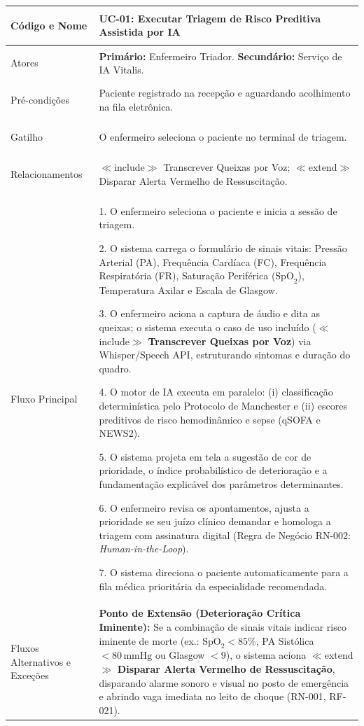 \begingroup
\small
\begin{tabularx}{\textwidth}{>{\bfseries\raggedright\arraybackslash}p{3.4cm} X}
\toprule
Código e Nome & UC-01: Executar Triagem de Risco Preditiva Assistida por IA \\
\midrule
Atores & \textbf{Primário:} Enfermeiro Triador. \textbf{Secundário:} Serviço de IA Vitalis. \\
Pré-condições & Paciente registrado na recepção e aguardando acolhimento na fila eletrônica. \\
Gatilho & O enfermeiro seleciona o paciente no terminal de triagem. \\
Relacionamentos & $\ll$include$\gg$ Transcrever Queixas por Voz; $\ll$extend$\gg$ Disparar Alerta Vermelho de Ressuscitação. \\
\midrule
Fluxo Principal & 
1. O enfermeiro seleciona o paciente e inicia a sessão de triagem.\par
2. O sistema carrega o formulário de sinais vitais: Pressão Arterial (PA), Frequência Cardíaca (FC), Frequência Respiratória (FR), Saturação Periférica ($\text{SpO}_2$), Temperatura Axilar e Escala de Glasgow.\par
3. O enfermeiro aciona a captura de áudio e dita as queixas; o sistema executa o caso de uso incluído ($\ll$include$\gg$ \textbf{Transcrever Queixas por Voz}) via Whisper/Speech API, estruturando sintomas e duração do quadro.\par
4. O motor de IA executa em paralelo: (i) classificação determinística pelo Protocolo de Manchester e (ii) escores preditivos de risco hemodinâmico e sepse (qSOFA e NEWS2).\par
5. O sistema projeta em tela a sugestão de cor de prioridade, o índice probabilístico de deterioração e a fundamentação explicável dos parâmetros determinantes.\par
6. O enfermeiro revisa os apontamentos, ajusta a prioridade se seu juízo clínico demandar e homologa a triagem com assinatura digital (Regra de Negócio RN-002: \textit{Human-in-the-Loop}).\par
7. O sistema direciona o paciente automaticamente para a fila médica prioritária da especialidade recomendada. \\
\midrule
Fluxos Alternativos e Exceções & 
\textbf{Ponto de Extensão (Deterioração Crítica Iminente):} Se a combinação de sinais vitais indicar risco iminente de morte (ex.: $\text{SpO}_2 < 85\%$, PA Sistólica $< 80\,\text{mmHg}$ ou Glasgow $< 9$), o sistema aciona $\ll$extend$\gg$ \textbf{Disparar Alerta Vermelho de Ressuscitação}, disparando alarme sonoro e visual no posto de emergência e abrindo vaga imediata no leito de choque (RN-001, RF-021).\par

\end{tabularx}
